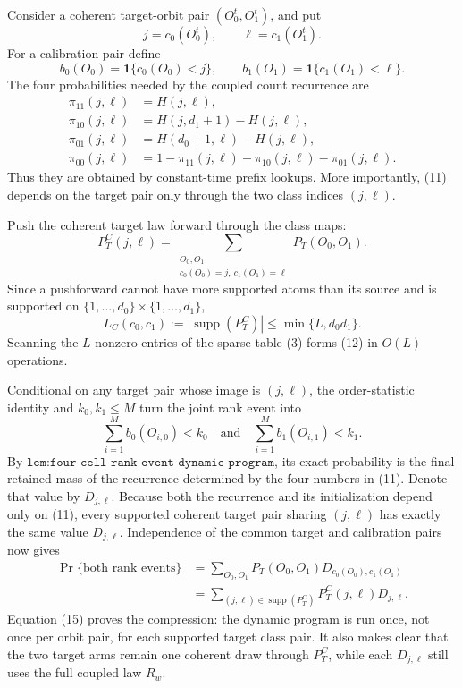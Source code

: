 Consider a coherent target-orbit pair \((O_0^t,O_1^t)\), and put
\[
j=c_0(O_0^t),\qquad \ell=c_1(O_1^t).
\tag{9}
\]
For a calibration pair define
\[
b_0(O_0)=\mathbf 1\{c_0(O_0)<j\},\qquad
b_1(O_1)=\mathbf 1\{c_1(O_1)<\ell\}.
\tag{10}
\]
The four probabilities needed by the coupled count recurrence are
\[
\begin{aligned}
\pi_{11}(j,\ell)&=H(j,\ell),\\
\pi_{10}(j,\ell)&=H(j,d_1+1)-H(j,\ell),\\
\pi_{01}(j,\ell)&=H(d_0+1,\ell)-H(j,\ell),\\
\pi_{00}(j,\ell)&=1-\pi_{11}(j,\ell)-\pi_{10}(j,\ell)-\pi_{01}(j,\ell).
\end{aligned}
\tag{11}
\]
Thus they are obtained by constant-time prefix lookups. More importantly, (11) depends on the target pair only through the two class indices \((j,\ell)\).

Push the coherent target law forward through the class maps:
\[
P_T^C(j,\ell)=
\sum_{\substack{O_0,O_1\\c_0(O_0)=j,\ c_1(O_1)=\ell}}
P_T(O_0,O_1).
\tag{12}
\]
Since a pushforward cannot have more supported atoms than its source and is supported on \(\{1,\ldots,d_0\}\times\{1,\ldots,d_1\}\),
\[
L_C(c_0,c_1):=|\operatorname{supp}(P_T^C)|
\le\min\{L,d_0d_1\}.
\tag{13}
\]
Scanning the \(L\) nonzero entries of the sparse table (3) forms (12) in \(O(L)\) operations.

Conditional on any target pair whose image is \((j,\ell)\), the order-statistic identity and \(k_0,k_1\le M\) turn the joint rank event into
\[
\sum_{i=1}^M b_0(O_{i,0})<k_0
\quad\text{and}\quad
\sum_{i=1}^M b_1(O_{i,1})<k_1.
\tag{14}
\]
By \(\texttt{lem:four-cell-rank-event-dynamic-program}\), its exact probability is the final retained mass of the recurrence determined by the four numbers in (11). Denote that value by \(D_{j,\ell}\). Because both the recurrence and its initialization depend only on (11), every supported coherent target pair sharing \((j,\ell)\) has exactly the same value \(D_{j,\ell}\). Independence of the common target and calibration pairs now gives
\[
\begin{aligned}
\Pr\{\text{both rank events}\}
&=\sum_{O_0,O_1}P_T(O_0,O_1)
D_{c_0(O_0),c_1(O_1)}\\
&=\sum_{(j,\ell)\in\operatorname{supp}(P_T^C)}
P_T^C(j,\ell)D_{j,\ell}.
\end{aligned}
\tag{15}
\]
Equation (15) proves the compression: the dynamic program is run once, not once per orbit pair, for each supported target class pair. It also makes clear that the two target arms remain one coherent draw through \(P_T^C\), while each \(D_{j,\ell}\) still uses the full coupled law \(R_w\).

